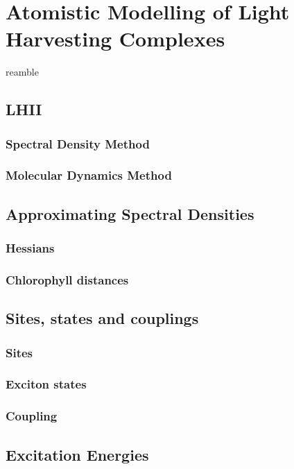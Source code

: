 %
%
\let\textcircled=\pgftextcircled
\chapter{Atomistic Modelling of Light Harvesting Complexes}
\label{chap:LHII}

reamble

\section{LHII}
\label{sec:LHII}

\subsection{Spectral Density Method}
\label{subsec:spec_dens}

\subsection{Molecular Dynamics Method}
\label{subsec:MD}

\section{Approximating Spectral Densities}
\label{sec:monomer_dimer_assign}

\subsection{Hessians}
\label{subsec:hessians}

\subsection{Chlorophyll distances}
\label{subsec:chl_distances}


\section{Sites, states and couplings}
\label{sec:sites_states_couplings}

\subsection{Sites}
\label{subsec:sites}

\subsection{Exciton states}
\label{subsec:states}

\subsection{Coupling}
\label{subsec:coupling}




\section{Excitation Energies}
\label{sec:excitation_energies}
